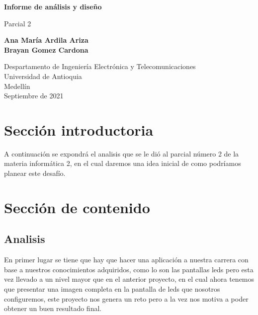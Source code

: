 \documentclass{article}
\begin{document}
\begin{titlepage}
    \begin{center}
        \vspace*{1cm}
            
        \Huge
        \textbf{Informe de análisis y diseño}
            
        \vspace{0.5cm}
        \LARGE
        Parcial 2
            
        \vspace{1.5cm}
            
        \textbf{Ana María Ardila Ariza\\ Brayan Gomez Cardona}
            
        \vfill
            
        \vspace{0.8cm}
            
        \Large
        Despartamento de Ingeniería Electrónica y Telecomunicaciones\\
        Universidad de Antioquia\\
        Medellín\\
        Septiembre de 2021
            
    \end{center}
\end{titlepage}

\tableofcontents
\newpage
\section{Sección introductoria}\label{intro}
A continuación se expondrá el analisis que se le dió al parcial número 2 de la materia informática 2, en el cual daremos una idea inicial de como podríamos planear este desafío. 

\section{Sección de contenido} \label{contenido}
\subsection{Analisis}
En primer lugar se tiene que hay que hacer una aplicación a nuestra carrera con base a nuestros conocimientos adquiridos, como lo son las pantallas leds pero esta vez llevado a un nivel mayor que en el anterior proyecto, en el cual ahora tenemos que presentar una imagen completa en la pantalla de leds que nosotros configuremos, este proyecto nos genera un reto pero a la vez nos motiva a poder obtener un buen resultado final.
\end{document}

